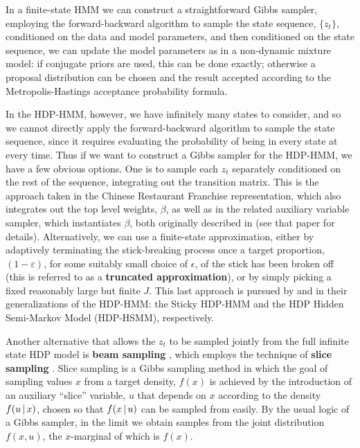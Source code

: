 In a finite-state HMM we can construct a straightforward Gibbs
sampler, employing the forward-backward algorithm to
sample the state sequence, $\{z_{t}\}$, conditioned on the data and
model parameters, and then conditioned on the state sequence, we can
update the model parameters as in a non-dynamic mixture model: if
conjugate priors are used, this can be done exactly; otherwise a
proposal distribution can be chosen and the result accepted according
to the Metropolis-Hastings acceptance probability formula.

In the HDP-HMM, however, we have infinitely many states to consider,
and so we cannot directly apply the forward-backward algorithm to
sample the state sequence, since it requires evaluating the
probability of being in every state at every time.  Thus if we want to
construct a Gibbs sampler for the HDP-HMM, we have a few obvious
options.  One is to sample each $z_t$ separately conditioned on the
rest of the sequence, integrating out the transition matrix.  
This is the approach taken in the Chinese
Restaurant Franchise representation, which also integrates out the top
level weights, $\beta$, as well as in the related auxiliary
variable sampler, which instantiates $\beta$, both originally described 
in \citet{teh2006hierarchical} (see that paper for details).  
Alternatively, we can use a finite-state approximation, either by
adaptively terminating the stick-breaking process once a target
proportion, $(1 - \varepsilon)$, for some suitably small choice of
$\epsilon$, of the stick has been broken off (this is referred to as a
{\bf truncated approximation}), or by simply picking a fixed reasonably
large but finite $J$.  This last approach is pursued by
\cite{fox2008hdp} and \cite{johnson2013bayesian} in their
generalizations of the HDP-HMM: the Sticky HDP-HMM and the HDP Hidden
Semi-Markov Model (HDP-HSMM), respectively.

Another alternative that allows the $z_t$ to be sampled jointly
from the full infinite state HDP model is {\bf beam sampling}
\cite{vangael2008beam}, which employs the technique of
{\bf slice sampling} \cite{neal2003slice}.  Slice sampling is a Gibbs
sampling method in which the goal of sampling values $x$ from a target
density, $f(x)$ is achieved by the introduction of an auxiliary
``slice'' variable, $u$ that depends on $x$ according to the density 
$f(u \, \vert \, x)$, chosen so that $f(x \, \vert \, u)$ can be sampled from
easily.  By the usual logic of a Gibbs sampler, in the limit we obtain
samples from the joint distribution $f(x,u)$, the $x$-marginal of
which is $f(x)$.

